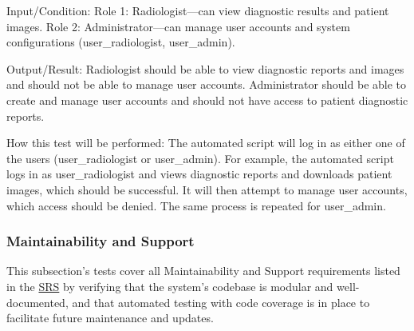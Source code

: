 \documentclass[12pt, titlepage]{article}
\begin{document}
\begin{enumerate}
Input/Condition: Role 1: Radiologist—can view diagnostic results and patient images. Role 2: Administrator—can manage user accounts and system configurations (user\_radiologist, user\_admin).

Output/Result: Radiologist should be able to view diagnostic reports and images and should not be able to manage user accounts. Administrator should be able to create and manage user accounts and should not have access to patient diagnostic reports.

How this test will be performed: The automated script will log in as either one of the users (user\_radiologist or user\_admin). For example, the automated script logs in as user\_radiologist and views diagnostic reports and downloads patient images, which should be successful. It will then attempt to manage user accounts, which access should be denied. The same process is repeated for user\_admin.

\end{enumerate}

\subsubsection{Maintainability and Support}

This subsection's tests cover all Maintainability and Support requirements listed in the \href{https://github.com/RezaJodeiri/CXR-Capstone/blob/main/docs/SRS/SRS.pdf}{SRS} \citep{SRS}
 by verifying that the system's codebase is modular and well-documented, and that automated testing with code coverage is in place to facilitate future maintenance and updates.
\end{document}
